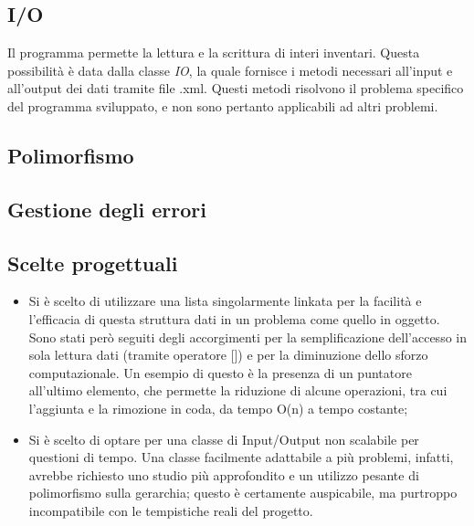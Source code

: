 \subsection{I/O}
Il programma permette la lettura e la scrittura di interi inventari. Questa possibilità è data dalla classe \textit{IO}, la quale fornisce i metodi necessari all'input e all'output dei dati tramite file .xml. Questi metodi risolvono il problema specifico del programma sviluppato, e non sono pertanto applicabili ad altri problemi.

\subsection{Polimorfismo}


\subsection{Gestione degli errori}



\subsection{Scelte progettuali}
\begin{itemize}
\item Si è scelto di utilizzare una lista singolarmente linkata per la facilità e l'efficacia di questa struttura dati in un problema come quello in oggetto. Sono stati però seguiti degli accorgimenti per la semplificazione dell'accesso in sola lettura dati (tramite operatore []) e per la diminuzione dello sforzo computazionale. Un esempio di questo è la presenza di un puntatore all'ultimo elemento, che permette la riduzione di alcune operazioni, tra cui l'aggiunta e la rimozione in coda, da tempo O(n) a tempo costante;
\item Si è scelto di optare per una classe di Input/Output non scalabile per questioni di tempo. Una classe facilmente adattabile a più problemi, infatti, avrebbe richiesto uno studio più approfondito e un utilizzo pesante di polimorfismo sulla gerarchia; questo è certamente auspicabile, ma purtroppo incompatibile con le tempistiche reali del progetto.
\end{itemize}
